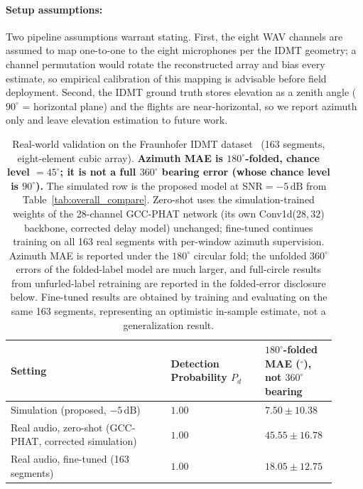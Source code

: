 \documentclass[5p,twocolumn]{elsarticle}
\begin{document}
\paragraph{Setup assumptions:}
Two pipeline assumptions warrant stating. First, the eight WAV channels are assumed to map one-to-one to the eight microphones per the IDMT geometry; a channel permutation would rotate the reconstructed array and bias every estimate, so empirical calibration of this mapping is advisable before field deployment. Second, the IDMT ground truth stores elevation as a zenith angle ($90^\circ$ = horizontal plane) and the flights are near-horizontal, so we report azimuth only and leave elevation estimation to future work.

\begin{table}[t]
\renewcommand{\arraystretch}{1.2}
\caption{Real-world validation on the Fraunhofer IDMT dataset~\cite{idmt2025drone} (163 segments, eight-element cubic array). \textbf{Azimuth MAE is $180^\circ$-folded, chance level $=45^\circ$; it is not a full $360^\circ$ bearing error (whose chance level is $90^\circ$).} The simulated row is the proposed model at $\mathrm{SNR}=-5\,\mathrm{dB}$ from Table~\ref{tab:overall_compare}. Zero-shot uses the simulation-trained weights of the 28-channel GCC-PHAT network (its own Conv1d($28,32$) backbone, corrected delay model) unchanged; fine-tuned continues training on all 163 real segments with per-window azimuth supervision. Azimuth MAE is reported under the $180^\circ$ circular fold; the unfolded $360^\circ$ errors of the folded-label model are much larger, and full-circle results from unfurled-label retraining are reported in the folded-error disclosure below. Fine-tuned results are obtained by training and evaluating on the same 163 segments, representing an optimistic in-sample estimate, not a generalization result.}
\label{tab:real}
\centering
\setlength{\tabcolsep}{4pt}
\begin{tabular}{p{0.46\linewidth}p{0.27\linewidth}p{0.18\linewidth}}
\toprule
Setting & Detection Probability $P_d$ & \textbf{$180^\circ$-folded MAE ($^\circ$), not $360^\circ$ bearing} \\
\midrule
Simulation (proposed, $-5\,\mathrm{dB}$) & $1.00$ & $7.50\pm10.38$ \\
Real audio, zero-shot (GCC-PHAT, corrected simulation) & $1.00$ & $45.55\pm16.78$ \\
Real audio, fine-tuned (163 segments) & $1.00$ & $\mathbf{18.05\pm12.75}$ \\
\bottomrule
\end{tabular}
\end{table}
\end{document}
